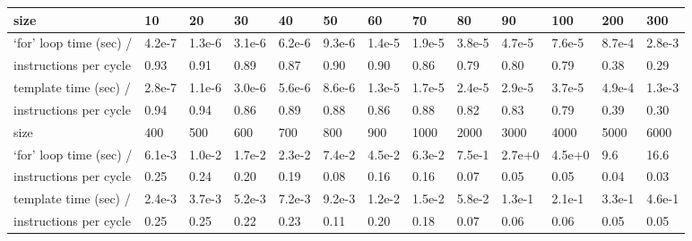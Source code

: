 \documentclass[a4paper,12pt]{article}
\begin{document}
\begin{tabular}{|l|l|l|l|l|l|l|l|l|l|l|l|l|}
\hline
size & 10 & 20 & 30 & 40 & 50 & 60 & 70 & 80 & 90 & 100 & 200 & 300 \\
\hline
`for' loop time (sec) / & 4.2e-7 & 1.3e-6 & 3.1e-6 & 6.2e-6 & 9.3e-6 & 1.4e-5 & 1.9e-5 &
3.8e-5 & 4.7e-5 & 7.6e-5 & 8.7e-4 & 2.8e-3 \\
instructions per cycle & 0.93 & 0.91 & 0.89 & 0.87 & 0.90 & 0.90 & 0.86 & 0.79 & 0.80 & 0.79 & 0.38 & 0.29\\
\hline
template time (sec) / & 2.8e-7 & 1.1e-6 & 3.0e-6 & 5.6e-6 & 8.6e-6 & 1.3e-5 & 1.7e-5 &
2.4e-5 & 2.9e-5 & 3.7e-5 & 4.9e-4 & 1.3e-3 \\
instructions per cycle & 0.94 & 0.94 & 0.86 & 0.89 & 0.88 & 0.86 & 0.88 & 0.82 & 0.83 & 0.79 & 0.39 & 0.30\\
\hline
\hline
size & 400 & 500 & 600 & 700 & 800 & 900 & 1000 & 2000 & 3000 & 4000 & 5000 & 6000 \\
\hline
`for' loop time (sec) / & 6.1e-3 & 1.0e-2 & 1.7e-2 & 2.3e-2 & 7.4e-2 & 4.5e-2 & 6.3e-2 &
7.5e-1 & 2.7e+0 & 4.5e+0 & 9.6 & 16.6 \\
instructions per cycle & 0.25 & 0.24 & 0.20 & 0.19 & 0.08 & 0.16 & 0.16 & 0.07 & 0.05 & 0.05 &
0.04 & 0.03\\
\hline
template time (sec) / & 2.4e-3 & 3.7e-3 & 5.2e-3 & 7.2e-3 & 9.2e-3 & 1.2e-2 & 1.5e-2 &
5.8e-2 & 1.3e-1 & 2.1e-1 & 3.3e-1 & 4.6e-1 \\
instructions per cycle & 0.25 & 0.25 & 0.22 & 0.23 & 0.11 & 0.20 & 0.18 & 0.07 & 0.06 & 0.06 &
0.05 & 0.05\\
\hline
\end{tabular}
\end{document}

